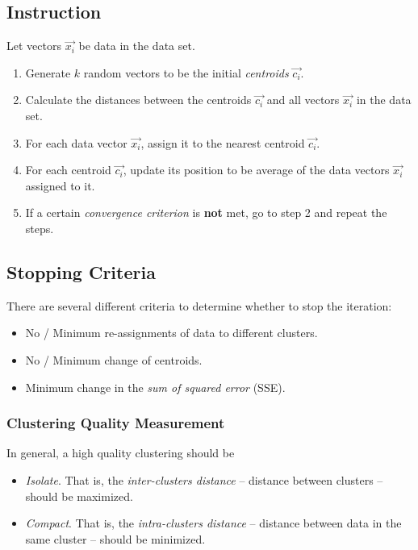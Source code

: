 \documentclass{note}
\begin{document}
\subsection{Instruction}

Let vectors $\Vec{x_i}$ be data in the data set.

\begin{enumerate}
    \item Generate $k$ random vectors to be the initial \textit{centroids} $\vec{c_i}$.
    \item Calculate the distances between the centroids $\vec{c_i}$ and all vectors $\vec{x_i}$ in the data set.
    \item For each data vector $\vec{x_i}$, assign it to the nearest centroid $\vec{c_i}$.
    \item For each centroid $\vec{c_i}$, update its position to be average of the data vectors $\vec{x_i}$ assigned to it.
    \item If a certain \textit{convergence criterion} is \textbf{not} met, go to step 2 and repeat the steps.
\end{enumerate}

\subsection{Stopping Criteria}

There are several different criteria to determine whether to stop the iteration: 
\begin{itemize}
    \item No / Minimum re-assignments of data to different clusters.
    \item No / Minimum change of centroids.
    \item Minimum change in the \textit{sum of squared error} (SSE).
\end{itemize}

\subsubsection{Clustering Quality Measurement}

In general, a high quality clustering should be
\begin{itemize}
    \item \textit{Isolate}. That is, the \textit{inter-clusters distance} -- distance between clusters -- should be maximized.
    \item \textit{Compact}. That is, the \textit{intra-clusters distance} -- distance between data in the same cluster -- should be minimized. 
\end{itemize}
\end{document}
